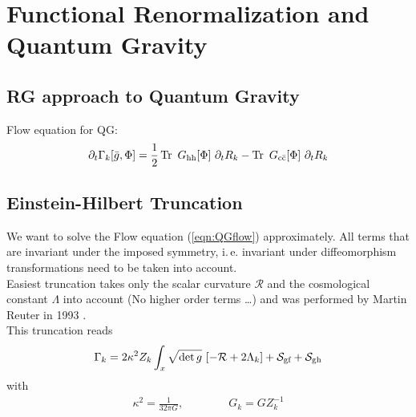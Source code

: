 \chapter{Functional Renormalization and Quantum Gravity}\label{chap:EHT}
\section{RG approach to Quantum Gravity}
Flow equation for QG:
\begin{align}
	\partial_t\Gammak[\bar{g}, \Phi] = \frac{1}{2} \operatorname{Tr}\ G_{\text{hh}}[\Phi] \ \partial_tR_k - \operatorname{Tr}\ G_{\text{c}\bar{\text{c}}}[\Phi] \ \partial_tR_k
\end{align}

\section{Einstein-Hilbert Truncation}
We want to solve the Flow equation (\ref{eqn:QGflow}) approximately. All terms that are invariant under the imposed symmetry, i.\,e. invariant under diffeomorphism transformations need to be taken into account. \\

Easiest truncation takes only the scalar curvature $\mathcal{R}$ and the cosmological constant $\Lambda$ into account (No higher order terms \dots) and was performed by Martin Reuter in 1993 \cite{ReuterSaueressig2002}. \\


This truncation reads
\begin{align}
	\Gammak = 2\kappa^2Z_k \int_x \sqrt{\operatorname{det}g} \ [-\mathcal{R} + 2\Lambda_k] + \mathcal{S}_{\text{gf}} + \mathcal{S}_{\text{gh}}
\label{eqn:QGflow}
\end{align}
with 
\begin{align}
	\kappa^2 = \frac{1}{32\pi G}, \qquad\qquad G_k = GZ^{-1}_k
\end{align}

